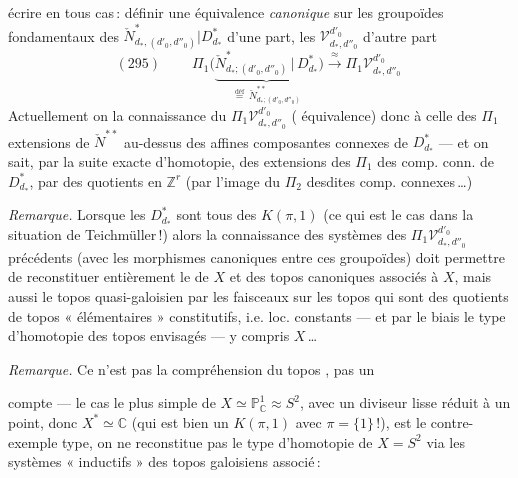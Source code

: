 \documentclass[11pt,a4paper]{article}
\begin{document}
écrire en tous cas\,: définir une équivalence \emph{canonique} sur les groupoïdes fondamentaux des $\check{N}^*_{d_*,(d'_0,d''_0)}|D^*_{d_*}$ d'une part, les $\mathcal{V}^{d'_0}_{d_*,d''_0}$ d'autre part
\[ (295)\qquad \boxed{\ \Pi_1\big(\underbrace{\check{N}^*_{d_*;(d'_0,d''_0)}\,|\,D^*_{d_*}}_{\overset{\text{déf}}{=}\ \check{N}^{**}_{d_*;(d'_0,d''_0)}}\big)\xrightarrow{\ \approx\ }\Pi_1\mathcal{V}^{d'_0}_{d_*,d''_0}\ } \]
 Actuellement on  la connaissance du $\Pi_1\mathcal{V}^{d'_0}_{d_*,d''_0}$ ( équivalence)  donc à celle des $\Pi_1$ extensions de $\check{N}^{**}$  au-dessus des affines composantes connexes de $D^*_{d_*}$ --- et on sait, par la suite exacte d'homotopie, des extensions des $\Pi_1$ des comp. conn. de $D^*_{d_*}$, par des quotients en $\mathbb{Z}^r$ (par l'image du $\Pi_2$ desdites comp. connexes\,…)

\emph{Remarque.} Lorsque les $D^*_{d_*}$ sont tous des $K(\pi,1)$ (ce qui est le cas dans la situation de Teichmüller\,!) alors la connaissance des systèmes des $\Pi_1\mathcal{V}^{d'_0}_{d_*,d''_0}$ précédents (avec les morphismes canoniques entre ces groupoïdes) doit permettre de reconstituer entièrement le   de $X$ et des   topos canoniques associés à $X$, mais aussi le topos quasi-galoisien  par les faisceaux sur les topos qui sont des quotients de topos « élémentaires » constitutifs, i.e. loc. constants --- et par le biais le type d'homotopie des topos envisagés --- y compris $X$\,…

\emph{Remarque.} Ce n'est pas la compréhension du topos , pas un 

compte --- le cas le plus simple de $X\simeq\mathbb{P}^1_{\mathbb{C}}\approx S^2$, avec un diviseur lisse réduit à un point, donc $X^*\simeq\mathbb{C}$ (qui est bien un $K(\pi,1)$ avec $\pi=\{1\}$\,!), est le contre-exemple type, \struck{\ill{}}  on ne reconstitue pas le type d'homotopie de $X=S^2$   via les systèmes « inductifs » des topos galoisiens associé\,:
\end{document}

